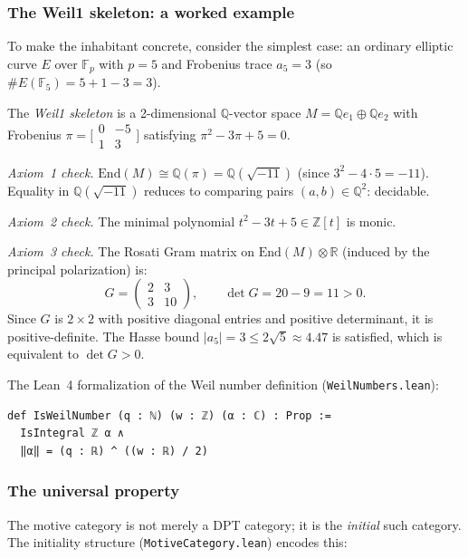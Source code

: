 \documentclass[11pt]{article}
\theoremstyle{definition}
\theoremstyle{remark}
\newcommand{\Z}{\mathbb{Z}}
\newcommand{\Q}{\mathbb{Q}}
\newcommand{\R}{\mathbb{R}}
\newcommand{\Fp}{\mathbb{F}_p}
\begin{document}
\subsubsection{The Weil1 skeleton: a worked example}

To make the inhabitant concrete, consider the simplest case: an ordinary elliptic curve $E$ over $\Fp$ with $p = 5$ and Frobenius trace $a_5 = 3$ (so $\#E(\mathbb{F}_5) = 5 + 1 - 3 = 3$).

The \emph{Weil1 skeleton} is a 2-dimensional $\Q$-vector space $M = \Q e_1 \oplus \Q e_2$ with Frobenius $\pi = \bigl[\begin{smallmatrix} 0 & -5 \\ 1 & 3 \end{smallmatrix}\bigr]$ satisfying $\pi^2 - 3\pi + 5 = 0$.

\emph{Axiom~1 check.} $\mathrm{End}(M) \cong \Q(\pi) = \Q(\sqrt{-11})$ (since $3^2 - 4 \cdot 5 = -11$). Equality in $\Q(\sqrt{-11})$ reduces to comparing pairs $(a,b) \in \Q^2$: decidable.

\emph{Axiom~2 check.} The minimal polynomial $t^2 - 3t + 5 \in \Z[t]$ is monic.

\emph{Axiom~3 check.} The Rosati Gram matrix on $\mathrm{End}(M) \otimes \R$ (induced by the principal polarization) is:
\[
G = \begin{pmatrix} 2 & 3 \\ 3 & 10 \end{pmatrix}, \qquad \det G = 20 - 9 = 11 > 0.
\]
Since $G$ is $2 \times 2$ with positive diagonal entries and positive determinant, it is positive-definite. The Hasse bound $|a_5| = 3 \leq 2\sqrt{5} \approx 4.47$ is satisfied, which is equivalent to $\det G > 0$.

The Lean~4 formalization of the Weil number definition (\texttt{WeilNumbers.lean}):

\begin{lstlisting}
def IsWeilNumber (q : ℕ) (w : ℤ) (α : ℂ) : Prop :=
  IsIntegral ℤ α ∧
  ‖α‖ = (q : ℝ) ^ ((w : ℝ) / 2)
\end{lstlisting}

\subsubsection{The universal property}

The motive category is not merely a DPT category; it is the \emph{initial} such category. The initiality structure (\texttt{MotiveCategory.lean}) encodes this:
\end{document}
